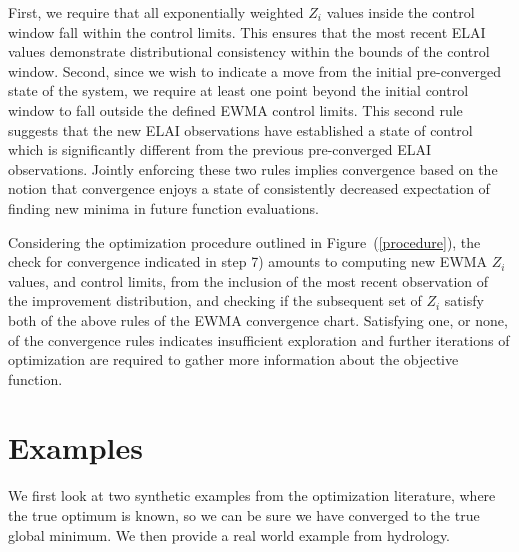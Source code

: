 \documentclass[12pt]{article}
\begin{document}
First, we require that all exponentially weighted $Z_i$ values inside the control window fall within the control limits.
%
This ensures that the most recent ELAI values demonstrate distributional consistency within the bounds of the control window.
%
Second, since we wish to indicate a move from the initial pre-converged state of the system, we require at least one point beyond the initial control window to fall outside the defined EWMA control limits.
This second rule suggests that the new ELAI observations have established a state of control which is significantly different from the previous pre-converged ELAI observations.
%
Jointly enforcing these two rules implies convergence based on the notion that convergence enjoys a state of consistently decreased expectation of finding new minima in future function evaluations.

%
%

%
Considering the optimization procedure outlined in Figure~(\ref{procedure}), the check for convergence indicated in step 7) amounts to computing new EWMA $Z_i$ values, and control limits, from the inclusion of the most recent observation of the improvement distribution, and checking if the subsequent set of $Z_i$ satisfy both of the above rules of the EWMA convergence chart.
%
Satisfying one, or none, of the convergence rules indicates insufficient exploration and further iterations of optimization are required to gather more information about the objective function.    


%
\vspace{-0.5cm}
%
%
\section{Examples}
\label{sec:examples}
%
We first look at two synthetic examples from the optimization literature, where the true optimum is known, so we can be sure we have converged to the true global minimum.  
%
We then provide a real world example from hydrology.
\end{document}
